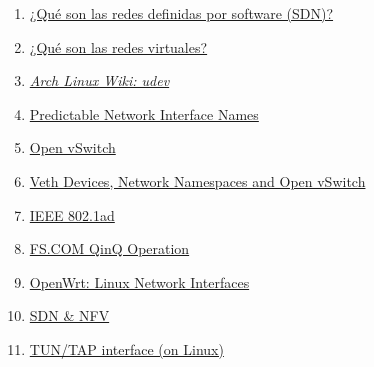 \documentclass[a4paper, oneside, 12pt]{book}
\begin{document}
\begin{enumerate}
		
		\item
		\label{bib: vmware sdn}
		\href{https://www.vmware.com/es/topics/glossary/content/software-defined-networking.html}{¿Qué son las redes definidas por software (SDN)?}
		
		\item
		\label{bib: vmware nfv}
		\href{https://www.vmware.com/es/topics/glossary/content/virtual-networking.html}{¿Qué son las redes virtuales?}
		
		\item
		\label{bib: udev archwiki}
		\href{https://wiki.archlinux.org/title/Udev}{\textit{Arch Linux Wiki: udev}}
		
		\item
		\label{bib: systemd networkd v197}
		\href{https://www.freedesktop.org/wiki/Software/systemd/PredictableNetworkInterfaceNames/}{Predictable Network Interface Names}
		
		\item
		\label{bib: open vswitch}
		\href{https://www.openvswitch.org/}{Open vSwitch}
		
		\item
		\label{bib: veth netns ovs}
		\href{https://matthewarcus.wordpress.com/2018/02/04/veth-devices-network-namespaces-and-open-vswitch/}{Veth Devices, Network Namespaces and Open vSwitch}
		
		\item
		\label{bib: 802.1ad}
		\href{http://www.microhowto.info/tags/802.1ad.html}{IEEE 802.1ad}
		
		\item
		\label{bib: FS QinQ}
		\href{https://img-en.fs.com/file/user_manual/s3800-series-qinq-operation.pdf}{FS.COM QinQ Operation}
		
		\item
		\label{bib: openwrt virtual network interfaces}
		\href{https://openwrt.org/docs/guide-developer/networking/network.interfaces}{OpenWrt: Linux Network Interfaces}
		
		\item
		\label{bib: sdn y nfv}
		\href{https://comparacloud.com/servicios-clouds/sdn-y-nfv/}{SDN \& NFV}
		
		\item
		\label{bib: tun vs tap}
		\href{https://www.gabriel.urdhr.fr/2021/05/08/tuntap/}{TUN/TAP interface (on Linux)}
		

\end{enumerate}
\end{document}
